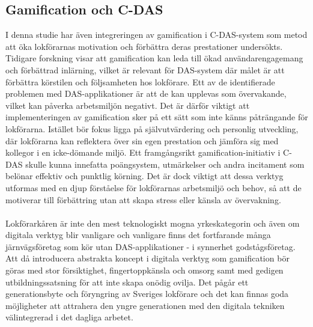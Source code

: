 \subsection{Gamification och C-DAS}
I denna studie har även integreringen av gamification i C-DAS-system som metod att öka lokförarnas motivation och förbättra deras prestationer undersökts.
Tidigare forskning visar att gamification kan leda till ökad användarengagemang och förbättrad inlärning, vilket är relevant för DAS-system där målet är att förbättra körstilen och följsamheten hos lokförare.
Ett av de identifierade problemen med DAS-applikationer är att de kan upplevas som övervakande, vilket kan påverka arbetsmiljön negativt.
Det är därför viktigt att implementeringen av gamification sker på ett sätt som inte känns påträngande för lokförarna.
Istället bör fokus ligga på självutvärdering och personlig utveckling, där lokförarna kan reflektera över sin egen prestation och jämföra sig med kollegor i en icke-dömande miljö.
Ett framgångsrikt gamification-initiativ i C-DAS skulle kunna innefatta poängsystem, utmärkelser och andra incitament som belönar effektiv och punktlig körning.
Det är dock viktigt att dessa verktyg utformas med en djup förståelse för lokförarnas arbetsmiljö och behov, så att de motiverar till förbättring utan att skapa stress eller känsla av övervakning.
\paragraph{}
\hspace{-14pt}
Lokförarkåren är inte den mest teknologiskt mogna yrkeskategorin och även om digitala verktyg blir vanligare och vanligare finns det fortfarande många järnvägsföretag som kör utan DAS-applikationer - i synnerhet godstågsföretag.
Att då introducera abstrakta koncept i digitala verktyg som gamification bör göras med stor försiktighet, fingertoppkänsla och omsorg samt med gedigen utbildningssatsning för att inte skapa onödig ovilja.
Det pågår ett generationsbyte och föryngring av Sveriges lokförare och det kan finnas goda möjligheter att attrahera den yngre generationen med den digitala tekniken välintegrerad i det dagliga arbetet.